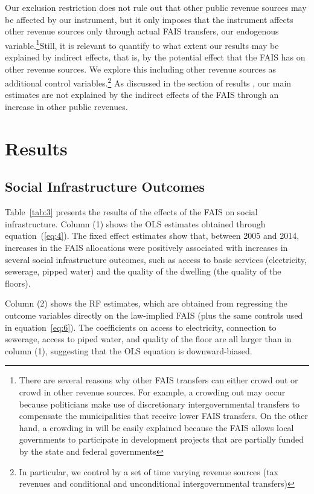 \documentclass[dv_diss_main.tex]{subfiles}
\begin{document}
Our exclusion restriction does not rule out that other public revenue sources may be affected by our instrument, but it only imposes that the instrument affects other revenue sources only through actual FAIS transfers, our endogenous variable.\footnote{ There are several reasons why other FAIS transfers can either crowd out or crowd in other revenue sources. For example, a crowding out may occur because politicians make use of discretionary intergovernmental transfers to compensate the municipalities that receive lower FAIS transfers. On the other hand, a crowding in will be easily explained because the FAIS allows local governments to participate in development projects that are partially funded by the state and federal governments}Still, it is relevant to quantify to what extent our results may be explained by indirect effects, that is, by the potential effect that the FAIS has on other revenue sources. We explore this including other revenue sources as additional control variables.\footnote{ In particular, we control by a set of time varying revenue sources (tax revenues and conditional and unconditional intergovernmental transfers)} As discussed in the section of results , our main estimates are not explained by the indirect effects of the FAIS through an increase in other public revenues.



\section{Results} \label{sec:results}
\subsection{Social Infrastructure Outcomes}\label{subsec:outcomes}

{Table}~\ref{tab:3} presents the results of the effects of the FAIS on social infrastructure. Column (1) shows the OLS estimates obtained through equation~(\ref{eq:4}). The fixed effect estimates show that, between 2005 and 2014, increases in the FAIS allocations were positively associated with increases in several social infrastructure outcomes, such as access to basic services (electricity, sewerage, pipped water) and the quality of the dwelling (the quality of the floors).

Column (2) shows the RF estimates, which are obtained from regressing the outcome variables directly on the law-implied FAIS (plus the same controls used in equation~\ref{eq:6}). The coefficients on access to electricity, connection to sewerage, access to piped water, and quality of the floor are all larger than in column (1), suggesting that the OLS equation is downward-biased.
\end{document}
